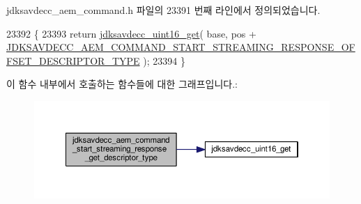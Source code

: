 jdksavdecc\+\_\+aem\+\_\+command.\+h 파일의 23391 번째 라인에서 정의되었습니다.


\begin{DoxyCode}
23392 \{
23393     \textcolor{keywordflow}{return} \hyperlink{group__endian_ga3fbbbc20be954aa61e039872965b0dc9}{jdksavdecc\_uint16\_get}( base, pos + 
      \hyperlink{group__command__start__streaming__response_ga86e1398a8b7e36d5efb1be8402190fac}{JDKSAVDECC\_AEM\_COMMAND\_START\_STREAMING\_RESPONSE\_OFFSET\_DESCRIPTOR\_TYPE}
       );
23394 \}
\end{DoxyCode}


이 함수 내부에서 호출하는 함수들에 대한 그래프입니다.\+:
\nopagebreak
\begin{figure}[H]
\begin{center}
\leavevmode
\includegraphics[width=350pt]{group__command__start__streaming__response_ga89f9710e58a269070610321fa9d67fc6_cgraph}
\end{center}
\end{figure}




